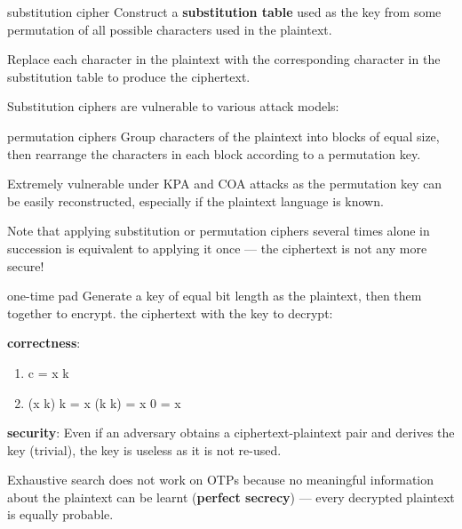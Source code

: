 \begin{defn}{substitution cipher}
    Construct a \textbf{substitution table} used as the key from some permutation of all possible characters used in the plaintext.

    Replace each character in the plaintext with the corresponding character in the substitution table to produce the ciphertext.

    Substitution ciphers are vulnerable to various attack models:
    \begin{itemize}
    \end{itemize}
\end{defn}

\begin{defn}{permutation ciphers}
    Group characters of the plaintext into blocks of equal size, then rearrange the characters in each block according to a permutation key.

    Extremely vulnerable under KPA and COA attacks as the permutation key can be easily reconstructed, especially if the plaintext language is known.
\end{defn}

Note that applying substitution or permutation ciphers several times alone in succession is equivalent to applying it once --- the ciphertext is not any more secure!

\begin{defn}{one-time pad}
    Generate a key of equal bit length as the plaintext, then  them together to encrypt.  the ciphertext with the key to decrypt:

    \textbf{correctness}:
    \begin{enumerate}
        \item c = x  k
        \item (x  k)  k = x  (k  k) = x  0 = x
    \end{enumerate}

    \textbf{security}:
    Even if an adversary obtains a ciphertext-plaintext pair and derives the key (trivial), the key is useless as it is not re-used.
\end{defn}

Exhaustive search does not work on OTPs because no meaningful information about the plaintext can be learnt (\textbf{perfect secrecy}) --- every decrypted plaintext is equally probable.

